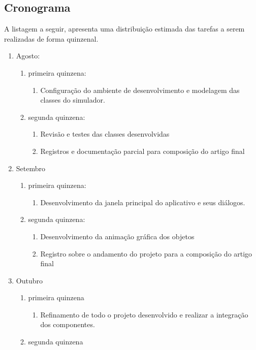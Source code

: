 \subsection{Cronograma}

A listagem a seguir, apresenta uma distribuição estimada das tarefas a serem
realizadas de forma quinzenal.

\begin{enumerate}
\item Agosto:
\begin{enumerate}
\item primeira quinzena:
\begin{enumerate}
\item Configuração do ambiente de desenvolvimento e modelagem das classes do simulador.
\end{enumerate}
\item segunda quinzena:
\begin{enumerate}
\item Revisão e testes das classes desenvolvidas
\item Registros e documentação parcial para composição do artigo final
\end{enumerate}
\end{enumerate}
\item Setembro
\begin{enumerate}
\item primeira quinzena:
\begin{enumerate}
\item Desenvolvimento da janela principal do aplicativo e seus diálogos.
\end{enumerate}
\item segunda quinzena:
\begin{enumerate}
\item Desenvolvimento da animação gráfica dos objetos
\item Registro sobre o andamento do projeto para a composição do artigo final
\end{enumerate}
\end{enumerate}
\item Outubro
\begin{enumerate}
\item primeira quinzena
\begin{enumerate}
\item Refinamento de todo o projeto desenvolvido e realizar a integração dos componentes.
\end{enumerate}
\item segunda quinzena

\end{enumerate}
\end{enumerate}
